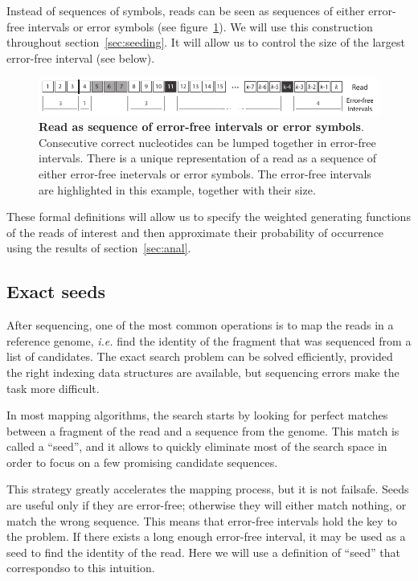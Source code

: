 \documentclass{article}
\begin{document}
Instead of sequences of symbols, reads can be seen as sequences of either
error-free intervals or error symbols (see
figure~\ref{fig:sketchseed_interval}). We will use this construction
throughout section~\ref{sec:seeding}. It will allow us to control the size
of the largest error-free interval (see below).

\begin{figure}[h]
\centering
\includegraphics[scale=0.88]{sketch_seeding_error_free_intervals.pdf}
\caption{\textbf{Read as sequence of error-free intervals or error
symbols}.
Consecutive correct nucleotides can be lumped together in error-free
intervals. There is a unique representation of a read as a sequence of
either error-free inetervals or error symbols. The error-free intervals
are highlighted in this example, together with their size.}
\label{fig:sketchseed_interval}
\end{figure}

These formal definitions will allow us to specify the weighted generating
functions of the reads of interest and then approximate their probability
of occurrence using the results of section~\ref{sec:anal}.


\subsection{Exact seeds}

After sequencing, one of the most common operations is to map the
reads in a reference genome, \textit{i.e.} find the identity of the
fragment that was sequenced from a list of candidates. The exact search
problem can be solved efficiently, provided the right indexing data
structures are available, but sequencing errors make the task more
difficult. 

In most mapping algorithms, the search starts by looking for perfect
matches between a fragment of the read and a sequence from the genome.
This match is called a ``seed'', and it allows to quickly eliminate most
of the search space in order to focus on a few promising candidate
sequences.

This strategy greatly accelerates the mapping process, but it is not
failsafe. Seeds are useful only if they are error-free; otherwise they
will either match nothing, or match the wrong sequence. This means that
error-free intervals hold the key to the problem. If there exists a long
enough error-free interval, it may be used as a seed to find the identity
of the read. Here we will use a definition of ``seed'' that correspondso
to this intuition.
\end{document}
